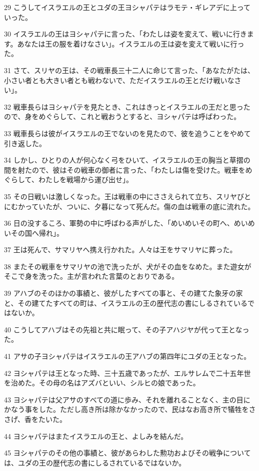 \par 29 こうしてイスラエルの王とユダの王ヨシャパテはラモテ・ギレアデに上っていった。
\par 30 イスラエルの王はヨシャパテに言った、「わたしは姿を変えて、戦いに行きます。あなたは王の服を着けなさい」。イスラエルの王は姿を変えて戦いに行った。
\par 31 さて、スリヤの王は、その戦車長三十二人に命じて言った、「あなたがたは、小さい者とも大きい者とも戦わないで、ただイスラエルの王とだけ戦いなさい」。
\par 32 戦車長らはヨシャパテを見たとき、これはきっとイスラエルの王だと思ったので、身をめぐらして、これと戦おうとすると、ヨシャパテは呼ばわった。
\par 33 戦車長らは彼がイスラエルの王でないのを見たので、彼を追うことをやめて引き返した。
\par 34 しかし、ひとりの人が何心なく弓をひいて、イスラエルの王の胸当と草摺の間を射たので、彼はその戦車の御者に言った、「わたしは傷を受けた。戦車をめぐらして、わたしを戦場から運び出せ」。
\par 35 その日戦いは激しくなった。王は戦車の中にささえられて立ち、スリヤびとにむかっていたが、ついに、夕暮になって死んだ。傷の血は戦車の底に流れた。
\par 36 日の没するころ、軍勢の中に呼ばわる声がした、「めいめいその町へ、めいめいその国へ帰れ」。
\par 37 王は死んで、サマリヤへ携え行かれた。人々は王をサマリヤに葬った。
\par 38 またその戦車をサマリヤの池で洗ったが、犬がその血をなめた。また遊女がそこで身を洗った。主が言われた言葉のとおりである。
\par 39 アハブのそのほかの事績と、彼がしたすべての事と、その建てた象牙の家と、その建てたすべての町は、イスラエルの王の歴代志の書にしるされているではないか。
\par 40 こうしてアハブはその先祖と共に眠って、その子アハジヤが代って王となった。
\par 41 アサの子ヨシャパテはイスラエルの王アハブの第四年にユダの王となった。
\par 42 ヨシャパテは王となった時、三十五歳であったが、エルサレムで二十五年世を治めた。その母の名はアズバといい、シルヒの娘であった。
\par 43 ヨシャパテは父アサのすべての道に歩み、それを離れることなく、主の目にかなう事をした。ただし高き所は除かなかったので、民はなお高き所で犠牲をささげ、香をたいた。
\par 44 ヨシャパテはまたイスラエルの王と、よしみを結んだ。
\par 45 ヨシャパテのその他の事績と、彼があらわした勲功およびその戦争については、ユダの王の歴代志の書にしるされているではないか。
